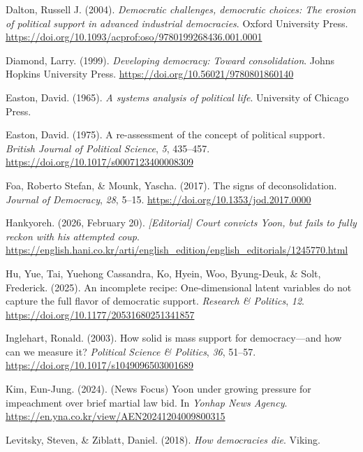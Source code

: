 \documentclass[
  12pt,
  12pt,
  letterpaper]{article}
\newlength{\cslhangindent}
\newenvironment{CSLReferences}[2] %
 {\begin{list}{}{%
  \setlength{\itemindent}{0pt}
  \setlength{\leftmargin}{0pt}
  \setlength{\parsep}{0pt}
  \ifodd #1
   \setlength{\leftmargin}{\cslhangindent}
   \setlength{\itemindent}{-1\cslhangindent}
  \fi
  \setlength{\itemsep}{#2\baselineskip}}}
 {\end{list}}
\begin{document}
\begin{CSLReferences}{1}{0}
Dalton, Russell J. (2004). \emph{{Democratic challenges, democratic
choices: The erosion of political support in advanced industrial
democracies}}. Oxford University Press.
\url{https://doi.org/10.1093/acprof:oso/9780199268436.001.0001}

Diamond, Larry. (1999). \emph{{Developing democracy: Toward
consolidation}}. Johns Hopkins University Press.
\url{https://doi.org/10.56021/9780801860140}

Easton, David. (1965). \emph{{A systems analysis of political life}}.
University of Chicago Press.

Easton, David. (1975). {A re-assessment of the concept of political
support}. \emph{British Journal of Political Science}, \emph{5},
435--457. \url{https://doi.org/10.1017/s0007123400008309}

Foa, Roberto Stefan, \& Mounk, Yascha. (2017). {The signs of
deconsolidation}. \emph{Journal of Democracy}, \emph{28}, 5--15.
\url{https://doi.org/10.1353/jod.2017.0000}

Hankyoreh. (2026, February 20). \emph{{{[}Editorial{]} Court convicts
Yoon, but fails to fully reckon with his attempted coup}}.
\url{https://english.hani.co.kr/arti/english_edition/english_editorials/1245770.html}

Hu, Yue, Tai, Yuehong Cassandra, Ko, Hyein, Woo, Byung-Deuk, \& Solt,
Frederick. (2025). {An incomplete recipe: One-dimensional latent
variables do not capture the full flavor of democratic support}.
\emph{Research \& Politics}, \emph{12}.
\url{https://doi.org/10.1177/20531680251341857}

Inglehart, Ronald. (2003). {How solid is mass support for
democracy---and how can we measure it?} \emph{Political Science \&
Politics}, \emph{36}, 51--57.
\url{https://doi.org/10.1017/s1049096503001689}

Kim, Eun-Jung. (2024). {(News Focus) Yoon under growing pressure for
impeachment over brief martial law bid}. In \emph{Yonhap News Agency}.
\url{https://en.yna.co.kr/view/AEN20241204009800315}

Levitsky, Steven, \& Ziblatt, Daniel. (2018). \emph{{How democracies
die}}. Viking.


\end{CSLReferences}
\end{document}
